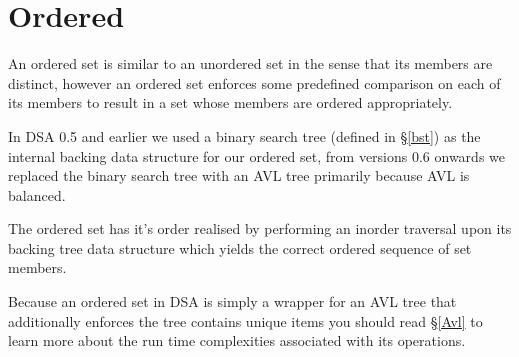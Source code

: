 \section{Ordered}
An ordered set is similar to an unordered set in the sense that its members are distinct, however an ordered set enforces some predefined comparison on each of its members to result in a set whose members are ordered appropriately.

In DSA 0.5 and earlier we used a binary search tree (defined in \S\ref{bst}) as the internal backing data structure for our ordered set, from versions 0.6 onwards we replaced the binary search tree with an AVL tree primarily because AVL is balanced.

The ordered set has it's order realised by performing an inorder traversal upon its backing tree data structure which yields the correct ordered sequence of set members.

Because an ordered set in DSA is simply a wrapper for an AVL tree that additionally enforces the tree contains unique items you should read \S\ref{Avl} to learn more about the run time complexities associated with its operations.
